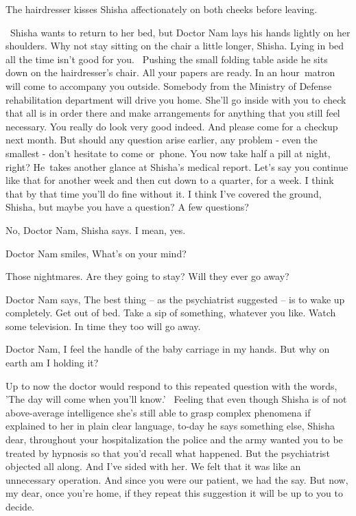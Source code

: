 \documentclass[12pt]{book}
\begin{document}
The hairdresser kisses Shisha affectionately on both cheeks before leaving.

~Shisha wants to return to her bed, but Doctor Nam lays his hands lightly on her shoulders. {\textquotedbl}Why not stay
sitting on the chair a little longer, Shisha. Lying in bed all the time isn't good for you.{\textquotedbl} \ Pushing
the small folding table aside he sits down on the hairdresser's chair. {\textquotedbl}All your papers are ready. In an
hour{~}matron will come to accompany you outside. Somebody from the Ministry of Defense rehabilitation
department will drive you home. She'll go inside with you to check that all is in order there and make arrangements for
anything that you still feel necessary. You really do look very good indeed. And please come for a checkup next month.
But should any question arise earlier, any problem - even the smallest - don't hesitate to come or~phone. You now take
half a pill at night, right?{\textquotedbl} He~takes another glance at Shisha's medical report. {\textquotedbl}Let's
say you continue like that for another week and then cut down to a quarter{,}
for a week. I think that by that time you'll do fine without it. I think I've covered the ground, Shisha, but maybe you
have a question? A few questions?{\textquotedbl}

{\textquotedbl}No, Doctor Nam,{\textquotedbl} Shisha says. {\textquotedbl}I mean, yes.{\textquotedbl}

Doctor Nam smiles, {\textquotedbl}What's on your mind?{\textquotedbl}

{\textquotedbl}Those nightmares. Are they going to stay? Will they ever go away?{\textquotedbl}

Doctor Nam says, {\textquotedbl}The best thing -- as the psychiatrist suggested -- is to wake up completely. Get out of
bed. Take a sip of something,{ }whatever you like. Watch some television. In
time they too will go away.{\textquotedbl}

{\textquotedbl}Doctor Nam, I feel the handle of the baby carriage in my hands. But why on earth am I holding
it?{\textquotedbl}

Up to now the doctor would respond to this repeated question with the words, 'The day will come when you'll know.'
~Feeling that even though Shisha is of not above{{}-}average intelligence she's
still able to grasp complex phenomena if explained to her in plain clear language, to-day he says something else,
{\textquotedbl}Shisha dear, throughout your hospitalization the police and the army wanted you to be treated by
hypnosis so that you'd recall what happened. But the psychiatrist objected all along. And I've sided with her. We felt
that it was like an unnecessary operation. And since you were our patient, we had the say. But now, my dear, once
you're home, if they repeat this suggestion it will be up to you to decide.{\textquotedbl}
\end{document}
